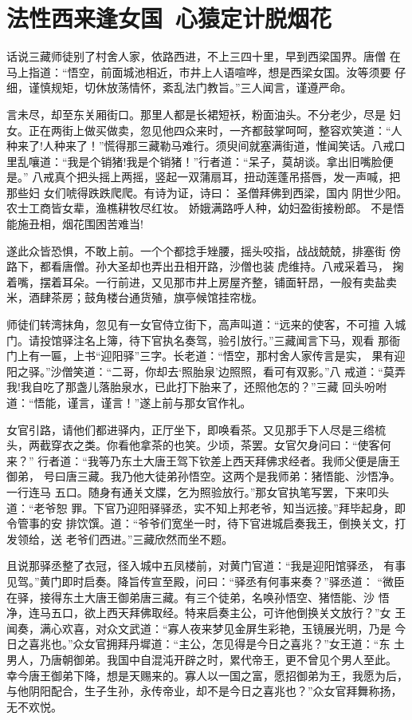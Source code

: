 \chapter{法性西来逢女国~心猿定计脱烟花}

话说三藏师徒别了村舍人家，依路西进，不上三四十里，早到西梁国界。唐僧
在马上指道：“悟空，前面城池相近，市井上人语喧哗，想是西梁女国。汝等须要
仔细，谨慎规矩，切休放荡情怀，紊乱法门教旨。”三人闻言，谨遵严命。

言未尽，却至东关厢街口。那里人都是长裙短袄，粉面油头。不分老少，尽是
妇女。正在两街上做买做卖，忽见他四众来时，一齐都鼓掌呵呵，整容欢笑道：“人
种来了!人种来了！”慌得那三藏勒马难行。须臾间就塞满街道，惟闻笑话。八戒口
里乱嚷道：“我是个销猪!我是个销猪！”行者道：“呆子，莫胡谈。拿出旧嘴脸便是。”
八戒真个把头摇上两摇，竖起一双蒲扇耳，扭动莲蓬吊搭唇，发一声喊，把那些妇
女们唬得跌跌爬爬。有诗为证，诗曰：
圣僧拜佛到西梁，国内阴世少阳。
农士工商皆女辈，渔樵耕牧尽红妆。
娇娥满路呼人种，幼妇盈街接粉郎。
不是悟能施丑相，烟花围困苦难当!

遂此众皆恐惧，不敢上前。一个个都捻手矬腰，摇头咬指，战战兢兢，排塞街
傍路下，都看唐僧。孙大圣却也弄出丑相开路，沙僧也装虎维持。八戒采着马，
掬着嘴，摆着耳朵。一行前进，又见那市井上房屋齐整，铺面轩昂，一般有卖盐卖
米，酒肆茶房；鼓角楼台通货殖，旗亭候馆挂帘栊。

师徒们转湾抹角，忽见有一女官侍立街下，高声叫道：“远来的使客，不可擅
入城门。请投馆驿注名上簿，待下官执名奏驾，验引放行。”三藏闻言下马，观看
那衙门上有一匾，上书“迎阳驿”三字。长老道：“悟空，那村舍人家传言是实，
果有迎阳之驿。”沙僧笑道：“二哥，你却去‘照胎泉’边照照，看可有双影。”八
戒道：“莫弄我!我自吃了那盏儿落胎泉水，已此打下胎来了，还照他怎的？”三藏
回头吩咐道：“悟能，谨言，谨言！”遂上前与那女官作礼。

女官引路，请他们都进驿内，正厅坐下，即唤看茶。又见那手下人尽是三绺梳
头，两截穿衣之类。你看他拿茶的也笑。少顷，茶罢。女官欠身问曰：“使客何来？”
行者道：“我等乃东土大唐王驾下钦差上西天拜佛求经者。我师父便是唐王御弟，
号曰唐三藏。我乃他大徒弟孙悟空。这两个是我师弟：猪悟能、沙悟净。一行连马
五口。随身有通关文牒，乞为照验放行。”那女官执笔写罢，下来叩头道：“老爷恕
罪。下官乃迎阳驿驿丞，实不知上邦老爷，知当远接。”拜毕起身，即令管事的安
排饮馔。道：“爷爷们宽坐一时，待下官进城启奏我王，倒换关文，打发领给，送
老爷们西进。”三藏欣然而坐不题。

且说那驿丞整了衣冠，径入城中五凤楼前，对黄门官道：“我是迎阳馆驿丞，
有事见驾。”黄门即时启奏。降旨传宣至殿，问曰：“驿丞有何事来奏？”驿丞道：
“微臣在驿，接得东土大唐王御弟唐三藏。有三个徒弟，名唤孙悟空、猪悟能、沙
悟净，连马五口，欲上西天拜佛取经。特来启奏主公，可许他倒换关文放行？”女
王闻奏，满心欢喜，对众文武道：“寡人夜来梦见金屏生彩艳，玉镜展光明，乃是
今日之喜兆也。”众女官拥拜丹墀道：“主公，怎见得是今日之喜兆？”女王道：“东
土男人，乃唐朝御弟。我国中自混沌开辟之时，累代帝王，更不曾见个男人至此。
幸今唐王御弟下降，想是天赐来的。寡人以一国之富，愿招御弟为王，我愿为后，
与他阴阳配合，生子生孙，永传帝业，却不是今日之喜兆也？”众女官拜舞称扬，
无不欢悦。

